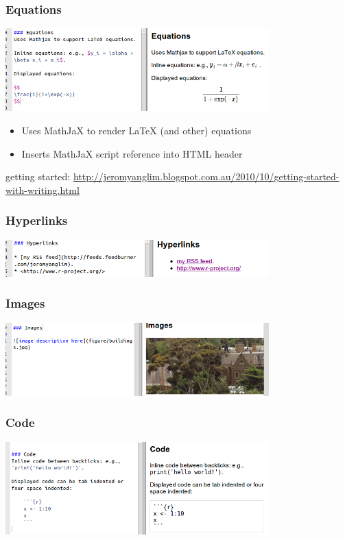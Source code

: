 \begin{frame}\frametitle{Equations}

\includegraphics[width=4in]{figures/equations.png}

\begin{itemize}
\item
  Uses MathJaX to render LaTeX (and other) equations
\item
  Inserts MathJaX script reference into HTML header
\end{itemize}

\tiny{getting started: \url{http://jeromyanglim.blogspot.com.au/2010/10/getting-started-with-writing.html}}

\end{frame}

\begin{frame}\frametitle{Hyperlinks}

\includegraphics[width=4in]{figures/links.png}

\end{frame}

\begin{frame}\frametitle{Images}

\includegraphics[width=4in]{figures/images.png}

\end{frame}

\begin{frame}\frametitle{Code}

\includegraphics[width=4in]{figures/code.png}

\end{frame}

